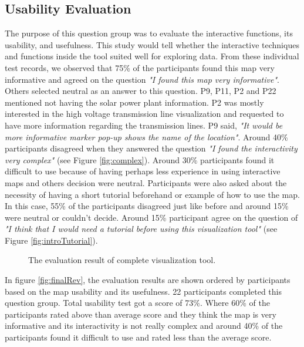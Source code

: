 \subsection*{Usability Evaluation}

The purpose of this question group was to evaluate the interactive functions, its usability, and usefulness. This study would tell whether the interactive techniques and functions inside the tool suited well for exploring data. From these individual test records, we observed that 75\% of the participants found this map very informative and agreed on the question \textit{"I found this map very informative"}. Others selected neutral as an answer to this question. P9, P11, P2 and P22 mentioned not having the solar power plant information. P2 was mostly interested in the high voltage transmission line visualization and requested to have more information regarding the transmission lines. P9 said, \textit{"It would be more informative marker pop-up shows the name of the location"}. Around 40\% participants disagreed when they answered the question \textit{"I found the interactivity very complex"} (see Figure \ref{fig:complex}). Around 30\% participants found it difficult to use because of having perhaps less experience in using interactive maps and others decision were neutral. Participants were also asked about the necessity of having a short tutorial beforehand or example of how to use the map. In this case, 55\% of the participants disagreed just like before and around 15\% were neutral or couldn't decide. Around 15\% participant agree on the question of \textit{"I think that I would need a tutorial before using this visualization tool"} (see Figure \ref{fig:introTutorial}). 

\begin{figure}
  \begin{center}
\hfill
{}
\hfill
\caption{The evaluation result of complete visualization tool.}
\label{fig:selfExpo}
\end{center}
\end{figure}

In figure \ref{fig:finalRev}, the evaluation results are shown ordered by participants based on the map usability and its usefulness. 22 participants completed this question group. Total usability test got a score of 73\%. Where 60\% of the participants rated above than average score and they think the map is very informative and its interactivity is not really complex and around 40\% of the participants found it difficult to use and rated less than the average score.

